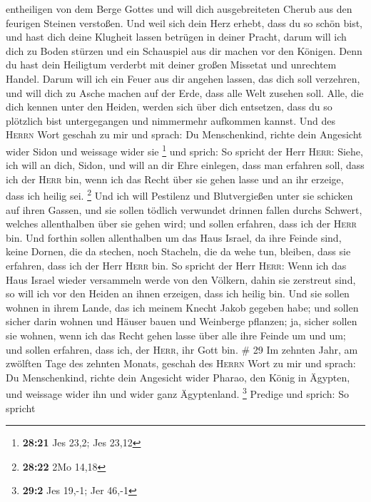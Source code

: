 entheiligen von dem Berge Gottes und will dich ausgebreiteten Cherub aus
den feurigen Steinen verstoßen.  Und weil sich dein Herz
erhebt, dass du so schön bist, und hast dich deine Klugheit lassen
betrügen in deiner Pracht, darum will ich dich zu Boden stürzen und ein
Schauspiel aus dir machen vor den Königen.  Denn du hast
dein Heiligtum verderbt mit deiner großen Missetat und unrechtem Handel.
Darum will ich ein Feuer aus dir angehen lassen, das dich soll
verzehren, und will dich zu Asche machen auf der Erde, dass alle Welt
zusehen soll.  Alle, die dich kennen unter den Heiden,
werden sich über dich entsetzen, dass du so plötzlich bist untergegangen
und nimmermehr aufkommen kannst.  Und des \textsc{Herrn}
Wort geschah zu mir und sprach:  Du Menschenkind, richte
dein Angesicht wider Sidon und weissage wider sie \footnote{\textbf{28:21}
  Jes 23,2; Jes 23,12}  und sprich: So spricht der Herr
\textsc{Herr}: Siehe, ich will an dich, Sidon, und will an dir Ehre
einlegen, dass man erfahren soll, dass ich der \textsc{Herr} bin, wenn
ich das Recht über sie gehen lasse und an ihr erzeige, dass ich heilig
sei. \footnote{\textbf{28:22} 2Mo 14,18}  Und ich will
Pestilenz und Blutvergießen unter sie schicken auf ihren Gassen, und sie
sollen tödlich verwundet drinnen fallen durchs Schwert, welches
allenthalben über sie gehen wird; und sollen erfahren, dass ich der
\textsc{Herr} bin.  Und forthin sollen allenthalben um
das Haus Israel, da ihre Feinde sind, keine Dornen, die da stechen, noch
Stacheln, die da wehe tun, bleiben, dass sie erfahren, dass ich der Herr
\textsc{Herr} bin.  So spricht der Herr \textsc{Herr}:
Wenn ich das Haus Israel wieder versammeln werde von den Völkern, dahin
sie zerstreut sind, so will ich vor den Heiden an ihnen erzeigen, dass
ich heilig bin. Und sie sollen wohnen in ihrem Lande, das ich meinem
Knecht Jakob gegeben habe;  und sollen sicher darin
wohnen und Häuser bauen und Weinberge pflanzen; ja, sicher sollen sie
wohnen, wenn ich das Recht gehen lasse über alle ihre Feinde um und um;
und sollen erfahren, dass ich, der \textsc{Herr}, ihr Gott bin. \# 29
 Im zehnten Jahr, am zwölften Tage des zehnten Monats,
geschah des \textsc{Herrn} Wort zu mir und sprach:  Du
Menschenkind, richte dein Angesicht wider Pharao, den König in Ägypten,
und weissage wider ihn und wider ganz Ägyptenland. \footnote{\textbf{29:2}
  Jes 19,-1; Jer 46,-1}  Predige und sprich: So spricht
